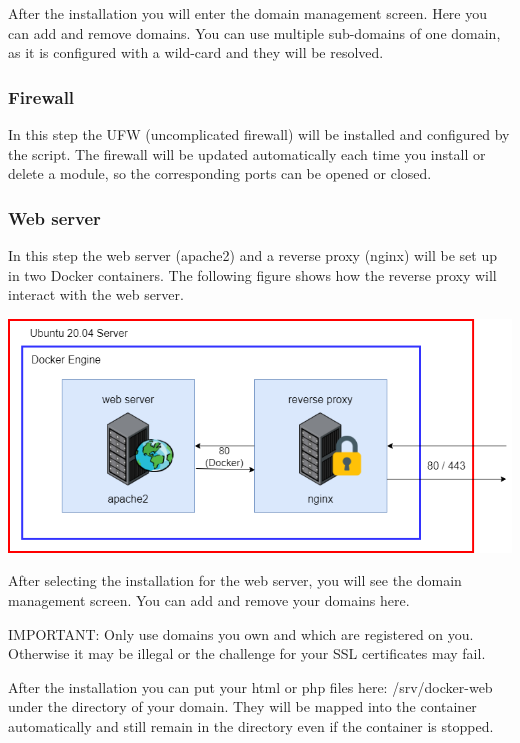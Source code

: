 \documentclass[a4paper,10pt]{scrartcl}
\begin{document}
\noindent After the installation you will enter the domain management screen. Here you can add and remove domains. You can use multiple sub-domains of one domain, as it is configured with a wild-card and they will be resolved.

\subsubsection{Firewall}

In this step the UFW (uncomplicated firewall) will be installed and configured by the script. The firewall will be updated automatically each time you install or delete a module, so the corresponding ports can be opened or closed.

\subsubsection{Web server}

In this step the web server (apache2) and a reverse proxy (nginx) will be set up in two Docker containers. The following figure shows how the reverse proxy will interact with the web server. \newline

\includegraphics[width=\textwidth]{web} \newline


\noindent After selecting the installation for the web server, you will see the domain management screen. You can add and remove your domains here. \newline

\noindent IMPORTANT: Only use domains you own and which are registered on you. Otherwise it may be illegal or the challenge for your SSL certificates may fail. \newline

\noindent After the installation you can put your html or php files here: /srv/docker-web under the directory of your domain. They will be mapped into the container automatically and still remain in the directory even if the container is stopped. \newline
\end{document}
